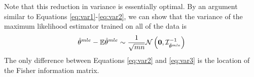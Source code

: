 \documentclass[twoside]{article}
\newtheorem{theorem}{Theorem}
\newtheorem{lemma}{Lemma}
\DeclareMathOperator*{\tr}{tr}
\newcommand{\zero}{\text{\textbf{0}}}
\newcommand{\E}{\mathbb{E}}
\newcommand{\x}{\mathbf{x}}
\newcommand{\w}{\theta}
\newcommand{\wave}{\hat\w^{ave}}
\newcommand{\wtave}{\E\hat\w^{ave}}
\newcommand{\wmle}{\hat\w^{mle}}
\newcommand{\tvar}{t_{\text{\textit{var}}}}
\newcommand{\I}{\mathcal I}
\newcommand{\normal}[2]{\ensuremath{\mathcal{N}\left({{#1}},{{#2}}\right)}}
\newcommand{\trans}[1]{\ensuremath{{#1}^{\mathsf{T}}}}
\newcommand{\ltwo}[1]{{\left\lVert {#1} \right\rVert}}
\newcommand{\prob}[1]{\Pr\left[{#1}\right]}
\newcommand{\ignore}[1]{}
\begin{document}
Note that this reduction in variance is essentially optimal.
By an argument similar to Equations \ref{eq:var1}-\ref{eq:var2},
we can show that the variance of the maximum likelihood estimator trained on all of the data is
\begin{equation}
\wmle - \E\wmle \sim \frac{1}{\sqrt{mn}} \normal{\zero}{\I^{-1}_{\wmle}}
\label{eq:var3}
\end{equation}
The only difference between Equations \ref{eq:var2} and \ref{eq:var3} is the location of the Fisher information matrix.



\end{document}
